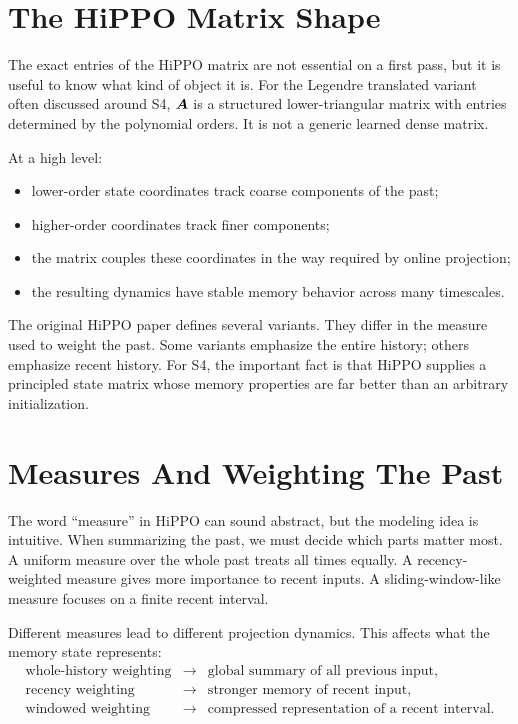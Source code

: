 \section{The HiPPO Matrix Shape}

The exact entries of the HiPPO matrix are not essential on a first pass, but it is useful
to know what kind of object it is. For the Legendre translated variant often discussed
around S4, $\bm{A}$ is a structured lower-triangular matrix with entries determined by the
polynomial orders. It is not a generic learned dense matrix.

At a high level:

\begin{itemize}
  \item lower-order state coordinates track coarse components of the past;
  \item higher-order coordinates track finer components;
  \item the matrix couples these coordinates in the way required by online projection;
  \item the resulting dynamics have stable memory behavior across many timescales.
\end{itemize}

The original HiPPO paper defines several variants. They differ in the measure used to
weight the past. Some variants emphasize the entire history; others emphasize recent
history. For S4, the important fact is that HiPPO supplies a principled state matrix
whose memory properties are far better than an arbitrary initialization.

\section{Measures And Weighting The Past}

The word ``measure'' in HiPPO can sound abstract, but the modeling idea is intuitive.
When summarizing the past, we must decide which parts matter most. A uniform measure over
the whole past treats all times equally. A recency-weighted measure gives more importance
to recent inputs. A sliding-window-like measure focuses on a finite recent interval.

Different measures lead to different projection dynamics. This affects what the memory
state represents:
\[
\begin{array}{lll}
\text{whole-history weighting} & \rightarrow & \text{global summary of all previous input}, \\
\text{recency weighting} & \rightarrow & \text{stronger memory of recent input}, \\
\text{windowed weighting} & \rightarrow & \text{compressed representation of a recent interval}.
\end{array}
\]

